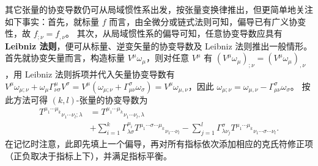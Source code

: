 其它张量的协变导数仍可从局域惯性系出发，按张量变换律推出，但更简单地关注如下事实：首先，就标量 $f$ 而言，由全微分或链式法则可知，偏导已有广义协变性，故 $f_{;\nu}=f_{,\nu}$。
其次，从局域惯性系的偏导可知，任意协变导数应具有\textbf{Leibniz 法则}，便可从标量、逆变矢量的协变导数及 Leibniz 法则推出一般情形。首先就协变矢量而言，构造标量 $V^\mu\omega_\mu$，则对任意 $V^\mu$ 有 $(V^\mu\omega_\mu)_{;\nu} = (V^\mu\omega_\mu)_{,\nu} $，用 Leibniz 法则拆项并代入矢量协变导数有 $V^\mu \omega_{\mu;\nu}+\omega_{\mu}\Gamma^\mu_{\nu\sigma}V^\sigma=V^\mu(\omega_{\mu;\nu}+\Gamma^\sigma_{\mu\nu}\omega_{\sigma})=V^\mu \omega_{\mu,\nu}$，因此 $\omega_{\mu;\nu}=\omega_{\mu,\nu}-\Gamma^\sigma_{\mu\nu}\omega_\sigma$。
按此方法可得 $(k,l)$-张量的协变导数为
\begin{align}\label{eq:cov-tens}
     T^{\mu_1\cdots\mu_k}{}_{\nu_1\cdots\nu_l;\lambda}&=
      T^{\mu_1\cdots\mu_k}{}_{\nu_1\cdots\nu_l,\lambda}\nonumber\\
&+\sum_{i=1}^k \Gamma^{\mu_i}_{\lambda \sigma} T^{\mu_1\cdots\sigma\cdots\mu_k}{}_{\nu_1\cdots\nu_l}-\sum_{j=1}^l\Gamma^{\sigma}_{\lambda \nu_j} T^{\mu_1\cdots\mu_k}{}_{\nu_1\cdots\sigma\cdots\nu_l}.
\end{align}
在记忆时注意，此即先填上一个偏导，再对所有指标依次添加相应的克氏符修正项（正负取决于指标上下），并满足指标平衡。

